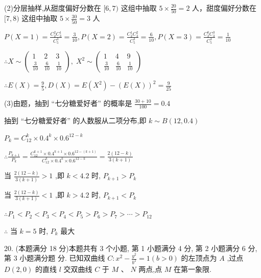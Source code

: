 \documentclass[10pt]{article}
\begin{document}
(2)分层抽样,从甜度偏好分数在 \(\lbrack 6,7)\) 这组中抽取 \(5 \times  \frac{20}{50} = 2\) 人，甜度偏好分数在 \(\lbrack 7,8)\) 这组中抽取 \(5 \times  \frac{30}{50} = 3\) 人

\(P\left( {X = 1}\right)  = \frac{{C}_{2}^{2}{C}_{3}^{1}}{{C}_{5}^{3}} = \frac{3}{10},P\left( {X = 2}\right)  = \frac{{C}_{2}^{1}{C}_{3}^{2}}{{C}_{5}^{3}} = \frac{6}{10},P\left( {X = 3}\right)  = \frac{{C}_{2}^{0}{C}_{3}^{3}}{{C}_{5}^{3}} = \frac{1}{10}\)

\(\therefore X \sim  \left( \begin{matrix} 1 & 2 & 3 \\  \frac{3}{10} & \frac{6}{10} & \frac{1}{10} \end{matrix}\right) ,\;{X}^{2} \sim  \left( \begin{matrix} 1 & 4 & 9 \\  \frac{3}{10} & \frac{6}{10} & \frac{1}{10} \end{matrix}\right)\)

\(\therefore E\left( X\right)  = \frac{9}{5},D\left( X\right)  = E\left( {X}^{2}\right)  - {\left( E\left( X\right) \right) }^{2} = \frac{9}{25}\)

(3)由题，抽到 “七分糖爱好者” 的概率是 \(\frac{{30} + {10}}{100} = {0.4}\)

抽到 “七分糖爱好者” 的人数服从二项分布,即 \(k \sim  B\left( {{12},{0.4}}\right)\)

\({P}_{k} = {C}_{12}^{k} \times  {0.4}^{k} \times  {0.6}^{{12} - k}\)

\(\therefore \frac{{P}_{k + 1}}{{P}_{k}} = \frac{{C}_{12}^{k + 1} \times  {0.4}^{k + 1} \times  {0.6}^{{12} - \left( {k + 1}\right) }}{{C}_{12}^{k} \times  {0.4}^{k} \times  {0.6}^{{12} - k}} = \frac{2\left( {{12} - k}\right) }{3\left( {k + 1}\right) }\)

当 \(\frac{2\left( {{12} - k}\right) }{3\left( {k + 1}\right) } > 1\) ,即 \(k < {4.2}\) 时, \({P}_{k + 1} > {P}_{k}\)

当 \(\frac{2\left( {{12} - k}\right) }{3\left( {k + 1}\right) } < 1\) ,即 \(k > {4.2}\) 时, \({P}_{k + 1} < {P}_{k}\)

\(\therefore {P}_{1} < {P}_{2} < {P}_{3} < {P}_{4} < {P}_{5} > {P}_{6} > {P}_{7} > \cdots  > {P}_{12}\)

\(\therefore\) 当 \(k = 5\) 时, \({P}_{k}\) 最大

20. (本题满分 18 分)本题共有 3 个小题, 第 1 小题满分 4 分, 第 2 小题满分 6 分, 第 3 小题满分题 分. 已知双曲线 \(C : {x}^{2} - \frac{{y}^{2}}{{b}^{2}} = 1\left( {b > 0}\right)\) 的左顶点为 \(A\) ,过点 \(D\left( {2,0}\right)\) 的直线 \(l\) 交双曲线 \(C\) 于 \(M\text{ 、 }N\) 两点,点 \(M\) 在第一象限.
\end{document}
